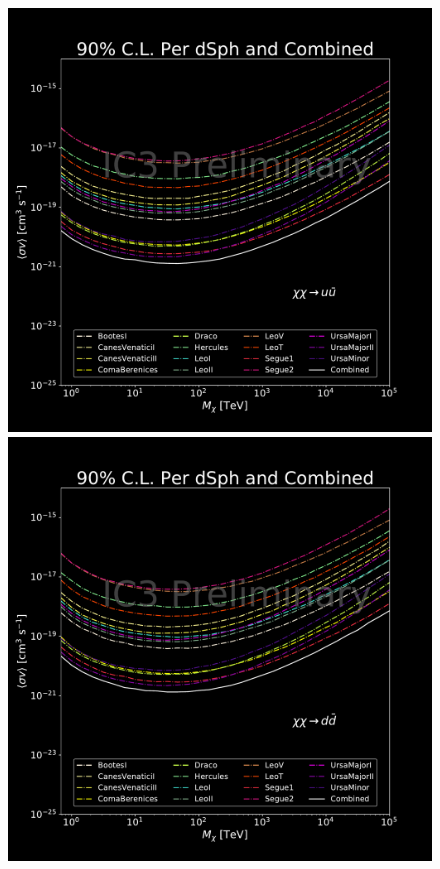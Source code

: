 \begin{figure}
{        \includegraphics[scale=0.265]{figures/ic_DM/dm_plots/uu_money_plot_comb.pdf}
        \includegraphics[scale=0.265]{figures/ic_DM/dm_plots/dd_money_plot_comb.pdf}
}
\end{figure}
